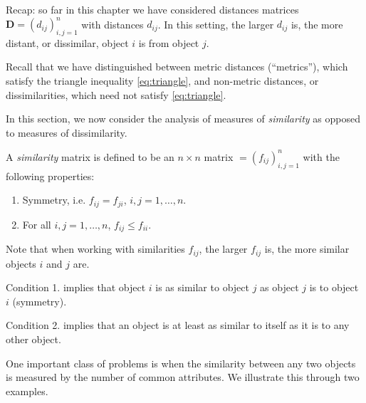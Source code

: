 \documentclass[]{book}
\providecommand{\tightlist}{%
  \setlength{\itemsep}{0pt}\setlength{\parskip}{0pt}}
\theoremstyle{definition}
\theoremstyle{definition}
\theoremstyle{definition}
\theoremstyle{remark}
\begin{document}
Recap: so far in this chapter we have considered distances matrices \(\boldsymbol D=(d_{ij})_{i,j=1}^n\) with distances \(d_{ij}\). In this setting, the larger \(d_{ij}\) is, the more distant, or dissimilar, object \(i\) is from object \(j\).

Recall that we have distinguished between metric distances (``metrics''), which satisfy the triangle inequality \eqref{eq:triangle}, and non-metric distances, or dissimilarities, which need not satisfy \eqref{eq:triangle}.

In this section, we now consider the analysis of measures of \emph{similarity} as opposed to measures of dissimilarity.

A \emph{similarity} matrix is defined to be an \(n \times n\) matrix \(\mathbf=(f_{ij})_{i,j=1}^n\) with the following properties:

\begin{enumerate}
\def\labelenumi{\arabic{enumi}.}
\tightlist
\item
  Symmetry, i.e. \(f_{ij} =f_{ji}\), \(i,j=1, \ldots , n\).
\item
  For all \(i,j=1, \ldots , n\), \(f_{ij} \leq f_{ii}\).
\end{enumerate}

Note that when working with similarities \(f_{ij}\), the larger \(f_{ij}\) is, the more similar objects \(i\) and \(j\) are.

Condition 1. implies that object \(i\) is as similar to object \(j\) as object \(j\) is to object \(i\) (symmetry).

Condition 2. implies that an object is at least as similar to itself as it is to any other object.

One important class of problems is when the similarity between any two objects is measured by the number of common attributes. We illustrate this through two examples.
\end{document}
